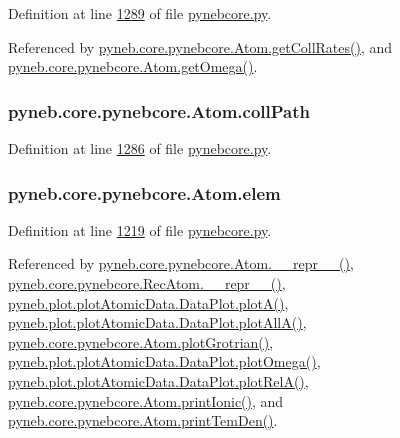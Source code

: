 Definition at line \hyperlink{pynebcore_8py_source_l01289}{1289} of file \hyperlink{pynebcore_8py_source}{pynebcore.\-py}.



Referenced by \hyperlink{pynebcore_8py_source_l01394}{pyneb.\-core.\-pynebcore.\-Atom.\-get\-Coll\-Rates()}, and \hyperlink{pynebcore_8py_source_l01324}{pyneb.\-core.\-pynebcore.\-Atom.\-get\-Omega()}.

\hypertarget{classpyneb_1_1core_1_1pynebcore_1_1_atom_a7afd231b8a40f04aff5d61b8cc20c387}{
\subsubsection[{coll\-Path}]{\setlength{\rightskip}{0pt plus 5cm}pyneb.\-core.\-pynebcore.\-Atom.\-coll\-Path}}\label{classpyneb_1_1core_1_1pynebcore_1_1_atom_a7afd231b8a40f04aff5d61b8cc20c387}


Definition at line \hyperlink{pynebcore_8py_source_l01286}{1286} of file \hyperlink{pynebcore_8py_source}{pynebcore.\-py}.

\hypertarget{classpyneb_1_1core_1_1pynebcore_1_1_atom_ae722bd0e35e1c8cdc0018d56c34171cf}{
\subsubsection[{elem}]{\setlength{\rightskip}{0pt plus 5cm}pyneb.\-core.\-pynebcore.\-Atom.\-elem}}\label{classpyneb_1_1core_1_1pynebcore_1_1_atom_ae722bd0e35e1c8cdc0018d56c34171cf}


Definition at line \hyperlink{pynebcore_8py_source_l01219}{1219} of file \hyperlink{pynebcore_8py_source}{pynebcore.\-py}.



Referenced by \hyperlink{pynebcore_8py_source_l02615}{pyneb.\-core.\-pynebcore.\-Atom.\-\_\-\-\_\-repr\-\_\-\-\_\-()}, \hyperlink{pynebcore_8py_source_l03154}{pyneb.\-core.\-pynebcore.\-Rec\-Atom.\-\_\-\-\_\-repr\-\_\-\-\_\-()}, \hyperlink{plot_atomic_data_8py_source_l00117}{pyneb.\-plot.\-plot\-Atomic\-Data.\-Data\-Plot.\-plot\-A()}, \hyperlink{plot_atomic_data_8py_source_l00189}{pyneb.\-plot.\-plot\-Atomic\-Data.\-Data\-Plot.\-plot\-All\-A()}, \hyperlink{pynebcore_8py_source_l02443}{pyneb.\-core.\-pynebcore.\-Atom.\-plot\-Grotrian()}, \hyperlink{plot_atomic_data_8py_source_l00373}{pyneb.\-plot.\-plot\-Atomic\-Data.\-Data\-Plot.\-plot\-Omega()}, \hyperlink{plot_atomic_data_8py_source_l00262}{pyneb.\-plot.\-plot\-Atomic\-Data.\-Data\-Plot.\-plot\-Rel\-A()}, \hyperlink{pynebcore_8py_source_l02233}{pyneb.\-core.\-pynebcore.\-Atom.\-print\-Ionic()}, and \hyperlink{pynebcore_8py_source_l02324}{pyneb.\-core.\-pynebcore.\-Atom.\-print\-Tem\-Den()}.

